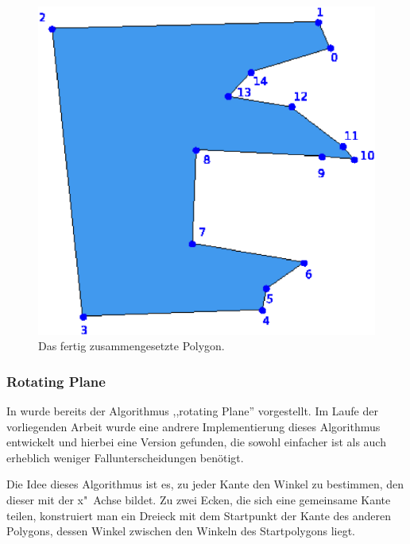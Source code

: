 \begin{figure}
	\centering
	\includegraphics[scale=0.6]{JLL3.svg.eps}
	\caption{Das fertig zusammengesetzte Polygon.}
	\label{fig:JLL3}
\end{figure}



\subsubsection{Rotating Plane} \label{rotPane}
In \cite{TG} wurde bereits der Algorithmus ,,rotating Plane'' vorgestellt. Im Laufe der vorliegenden Arbeit wurde eine andrere Implementierung dieses Algorithmus entwickelt und hierbei eine Version gefunden, die sowohl einfacher ist als auch erheblich weniger Fallunterscheidungen benötigt.

Die Idee dieses Algorithmus ist es, zu jeder Kante den Winkel zu bestimmen, den dieser mit der x"~Achse bildet. Zu zwei Ecken, die sich eine gemeinsame Kante teilen, konstruiert man ein Dreieck mit dem Startpunkt der Kante des anderen Polygons, dessen Winkel zwischen den Winkeln des Startpolygons liegt.

